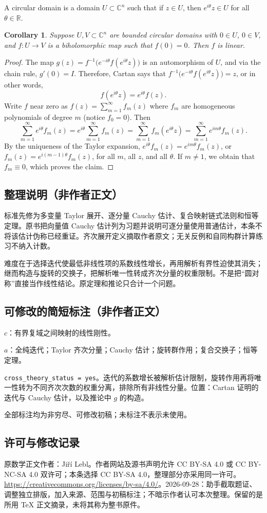 \documentclass[UTF8,11pt]{ctexart}
\newtheorem*{cor}{Corollary}
\theoremstyle{definition}
\newcommand{\R}{\mathbb R}
\newcommand{\C}{\mathbb C}
\begin{document}
A circular domain is a domain $U\subset\C^n$ such that if $z\in U$, then $e^{i\theta}z\in U$ for all $\theta\in\R$.
\begin{cor}
Suppose $U,V\subset\C^n$ are bounded circular domains with $0\in U$, $0\in V$, and $f:U\to V$ is a biholomorphic map such that $f(0)=0$. Then $f$ is linear.
\end{cor}
\begin{proof}
The map $g(z)=f^{-1}\bigl(e^{-i\theta}f(e^{i\theta}z)\bigr)$ is an automorphism of $U$, and via the chain rule, $g'(0)=I$. Therefore, Cartan says that $f^{-1}\bigl(e^{-i\theta}f(e^{i\theta}z)\bigr)=z$, or in other words,
\[f(e^{i\theta}z)=e^{i\theta}f(z).\]
Write $f$ near zero as $f(z)=\sum_{m=1}^\infty f_m(z)$ where $f_m$ are homogeneous polynomials of degree $m$ (notice $f_0=0$). Then
\[
\sum_{m=1}^\infty e^{i\theta}f_m(z)=e^{i\theta}\sum_{m=1}^\infty f_m(z)=\sum_{m=1}^\infty f_m(e^{i\theta}z)=\sum_{m=1}^\infty e^{im\theta}f_m(z).
\]
By the uniqueness of the Taylor expansion, $e^{i\theta}f_m(z)=e^{im\theta}f_m(z)$, or $f_m(z)=e^{i(m-1)\theta}f_m(z)$, for all $m$, all $z$, and all $\theta$. If $m\neq1$, we obtain that $f_m\equiv0$, which proves the claim.
\end{proof}

\subsection*{整理说明（非作者正文）}
标准先修为多变量 Taylor 展开、逐分量 Cauchy 估计、复合映射链式法则和恒等定理。原书把向量值 Cauchy 估计列为习题并说明可逐分量使用普通估计，本条不将该估计伪称已经重证。齐次展开定义摘取作者原文；无关反例和自同构群计算练习不纳入计数。

难度在于选择迭代使最低非线性项的系数线性增长，再用解析有界性迫使其消失；继而构造与旋转的交换子，把解析唯一性转成齐次分量的权重限制。不是把“圆对称”直接当作线性结论。原定理和推论只合计一个问题。
\subsection*{可修改的简短标注（非作者正文）}
$c$：有界复域之间映射的线性刚性。

$a$：全纯迭代；Taylor 齐次分量；Cauchy 估计；旋转群作用；复合交换子；恒等定理。

\texttt{cross\_theory\_status = yes}。迭代的系数增长被解析估计限制，旋转作用再将唯一性转为不同齐次次数的权重分离，排除所有非线性分量。位置：Cartan 证明的迭代与 Cauchy 估计，以及推论中 $g$ 的构造。

全部标注均为非穷尽、可修改初稿；未标注不表示未使用。
\subsection*{许可与修改记录}
原数学正文作者：Ji\v{r}\'i Lebl。作者网站及源书声明允许 CC BY-SA 4.0 或 CC BY-NC-SA 4.0 双许可；本条选择 CC BY-SA 4.0，整理部分亦采用同一许可。\url{https://creativecommons.org/licenses/by-sa/4.0/}。2026-09-28：助手截取题证、调整独立排版，加入来源、范围与初稿标注；不暗示作者认可本次整理。保留的是所用 TeX 正文摘录，未将其称为整书原件。
\end{document}
